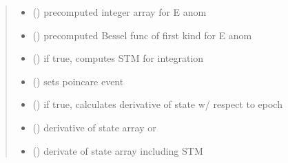 \documentclass[letterpaper,10pt,english]{sphinxmanual}
\begin{document}
\begin{fulllineitems}
\begin{quote}
\begin{description}
\begin{itemize}
\item {} 
\sphinxAtStartPar
{} () \sphinxhyphen{}\sphinxhyphen{} pre\sphinxhyphen{}computed integer array for E anom

\item {} 
\sphinxAtStartPar
{} () \sphinxhyphen{}\sphinxhyphen{} pre\sphinxhyphen{}computed Bessel func of first kind for E anom

\item {} 
\sphinxAtStartPar
{} () \sphinxhyphen{}\sphinxhyphen{} if true, computes STM for integration

\item {} 
\sphinxAtStartPar
{} () \sphinxhyphen{}\sphinxhyphen{} sets poincare event

\item {} 
\sphinxAtStartPar
{} () \sphinxhyphen{}\sphinxhyphen{} if true, calculates derivative of state w/ respect to epoch

\end{itemize}

\sphinxAtStartPar
\begin{itemize}
\item {} 
\sphinxAtStartPar
{} () \sphinxhyphen{}\sphinxhyphen{} derivative of state array
or

\item {} 
\sphinxAtStartPar
{} () \sphinxhyphen{}\sphinxhyphen{} derivate of state array including STM

\end{itemize}


\end{description}\end{quote}

\end{fulllineitems}

\end{document}
